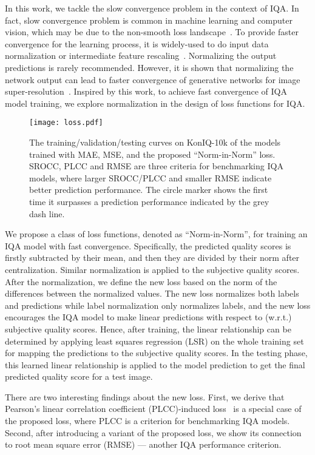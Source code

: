 \documentclass[sigconf]{acmart}
\begin{document}
In this work, we tackle the slow convergence problem in the context of IQA. 
In fact, slow convergence problem is common in machine learning and computer vision, which may be due to the non-smooth loss landscape~\cite{santurkar2018does}.
To provide faster convergence for the learning process, it is widely-used to do input data normalization or intermediate feature rescaling~\cite{ioffe2015batch,hoffer2018norm}.
Normalizing the output predictions is rarely recommended.
However, it is shown that normalizing the network output can lead to faster convergence of generative networks for image super-resolution~\cite{mullery2018batch}.
Inspired by this work, to achieve fast convergence of IQA model training, we explore normalization in the design of loss functions for IQA. 

\begin{figure*}[!htb]
    \centering
    \texttt{[image: loss.pdf]}
    \caption{The training/validation/testing curves on KonIQ-10k of the models trained with MAE, MSE, and the proposed ``Norm-in-Norm'' loss. SROCC, PLCC and RMSE are three criteria for benchmarking IQA models, where larger SROCC/PLCC and smaller RMSE indicate better prediction performance. The circle marker shows the first time it surpasses a prediction performance indicated by the grey dash line.}\label{fig:loss}
\end{figure*}

We propose a class of loss functions, denoted as ``Norm-in-Norm'', for training an IQA model with fast convergence.
Specifically, the predicted quality scores is firstly subtracted by their mean, and then they are divided by their norm after centralization. 
Similar normalization is applied to the subjective quality scores.
After the normalization, we define the new loss based on the norm of the differences between the normalized values.
The new loss normalizes both labels and predictions while label normalization only normalizes labels, and the new loss encourages the IQA model to make linear predictions with respect to (w.r.t.) subjective quality scores.
Hence, after training, the linear relationship can be determined by applying least squares regression (LSR) on the whole training set for mapping the predictions to the subjective quality scores. 
In the testing phase, this learned linear relationship is applied to the model prediction to get the final predicted quality score for a test image.


There are two interesting findings about the new loss.
First, we derive that Pearson's linear correlation coefficient (PLCC)-induced loss~\cite{ma2018geometric,liu2018end} is a special case of the proposed loss, where PLCC is a criterion for benchmarking IQA models.
Second, after introducing a variant of the proposed loss, we show its connection to root mean square error (RMSE) --- another IQA performance criterion.
\end{document}
